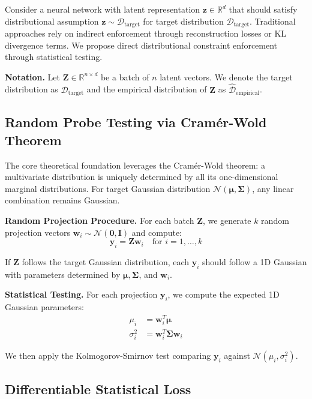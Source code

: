 \documentclass{article}
\begin{document}
Consider a neural network with latent representation $\mathbf{z} \in \mathbb{R}^d$ that should satisfy distributional assumption $\mathbf{z} \sim \mathcal{D}_{\text{target}}$ for target distribution $\mathcal{D}_{\text{target}}$. Traditional approaches rely on indirect enforcement through reconstruction losses or KL divergence terms. We propose direct distributional constraint enforcement through statistical testing.

\textbf{Notation.} Let $\mathbf{Z} \in \mathbb{R}^{n \times d}$ be a batch of $n$ latent vectors. We denote the target distribution as $\mathcal{D}_{\text{target}}$ and the empirical distribution of $\mathbf{Z}$ as $\hat{\mathcal{D}}_{\text{empirical}}$.

\subsection{Random Probe Testing via Cramér-Wold Theorem}

The core theoretical foundation leverages the Cramér-Wold theorem: a multivariate distribution is uniquely determined by all its one-dimensional marginal distributions. For target Gaussian distribution $\mathcal{N}(\boldsymbol{\mu}, \boldsymbol{\Sigma})$, any linear combination remains Gaussian.

\textbf{Random Projection Procedure.} For each batch $\mathbf{Z}$, we generate $k$ random projection vectors $\mathbf{w}_i \sim \mathcal{N}(\mathbf{0}, \mathbf{I})$ and compute:
\begin{equation}
\mathbf{y}_i = \mathbf{Z} \mathbf{w}_i \quad \text{for } i = 1, \ldots, k
\end{equation}

If $\mathbf{Z}$ follows the target Gaussian distribution, each $\mathbf{y}_i$ should follow a 1D Gaussian with parameters determined by $\boldsymbol{\mu}, \boldsymbol{\Sigma}$, and $\mathbf{w}_i$.

\textbf{Statistical Testing.} For each projection $\mathbf{y}_i$, we compute the expected 1D Gaussian parameters:
\begin{align}
\mu_i &= \mathbf{w}_i^T \boldsymbol{\mu} \\
\sigma_i^2 &= \mathbf{w}_i^T \boldsymbol{\Sigma} \mathbf{w}_i
\end{align}

We then apply the Kolmogorov-Smirnov test comparing $\mathbf{y}_i$ against $\mathcal{N}(\mu_i, \sigma_i^2)$.

\subsection{Differentiable Statistical Loss}
\end{document}
